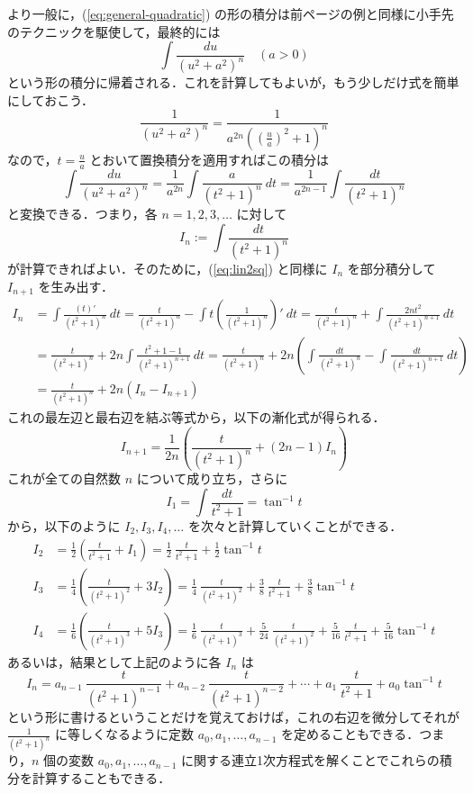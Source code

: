 \documentclass[10pt, uplatex, dvipdfmx]{jsarticle}
\theoremstyle{definition}
\numberwithin{equation}{section}
\newcommand{\ds}{\displaystyle}
\begin{document}
\newpage

より一般に，(\ref{eq:general-quadratic}) の形の積分は前ページの例と同様に小手先のテクニックを駆使して，最終的には
\[
  \int \frac{du}{(u^2+a^2)^n} \quad ( a>0 )
\]
という形の積分に帰着される．これを計算してもよいが，もう少しだけ式を簡単にしておこう．
\[
  \frac{1}{(u^2+a^2)^n} = \frac{1}{a^{2n}\left( \left(\frac{u}{a}\right)^2+1\right)^n}
\]
なので，$\ds t=\frac{u}{a}$ とおいて置換積分を適用すればこの積分は
\[
  \int \frac{du}{(u^2+a^2)^n} = \frac{1}{a^{2n}} \int \frac{a}{(t^2+1)^n} \ dt = \frac{1}{a^{2n-1}} \int \frac{dt}{(t^2+1)^n}
\]
と変換できる．つまり，各 $n=1,2,3, \ldots$ に対して
\[
  I_n := \int \frac{dt}{(t^2+1)^n} 
\]
が計算できればよい．そのために，(\ref{eq:lin2sq}) と同様に $I_{n}$ を部分積分して $I_{n+1}$ を生み出す．
\[
  \begin{aligned}
    I_{n}
    & = \int \frac{(t)'}{(t^2+1)^n} \ dt = \frac{t}{(t^2+1)^n} - \int t\left( \frac{1}{\left(t^2+1\right)^n}\right)' \ dt
      = \frac{t}{(t^2+1)^n} + \int \frac{2nt^2}{(t^2+1)^{n+1}} \ dt\\[2ex]
    & = \frac{t}{(t^2+1)^n} + 2n \int \frac{t^2+1 - 1}{(t^2+1)^{n+1}} \ dt
      =\frac{t}{(t^2+1)^n} + 2n \left( \int \frac{dt}{(t^2+1)^n} - \int \frac{dt}{(t^2+1)^{n+1}} \ dt\right)\\[2ex]
    &= \frac{t}{(t^2+1)^n} + 2n\left( I_n -  I_{n+1}\right)
  \end{aligned}
\]
これの最左辺と最右辺を結ぶ等式から，以下の漸化式が得られる．
\[
  I_{n+1} = \frac{1}{2n}\left( \frac{t}{(t^2+1)^n} + (2n-1)I_n\right)
\]
これが全ての自然数 $n$ について成り立ち，さらに
\[
  I_1 = \int \frac{dt}{t^2+1} = \tan^{-1}t
\]
から，以下のように $I_2, I_3, I_4, \ldots$ を次々と計算していくことができる．
\[
  \begin{aligned}
    I_2 &= \frac{1}{2}\left(\frac{t}{t^2+1} + I_1 \right) = \frac{1}{2}~ \frac{t}{t^2+1} + \frac{1}{2}\tan^{-1}t \\[1ex]
    I_3 &= \frac{1}{4}\left(\frac{t}{(t^2+1)^2} + 3 I_2\right)=\frac{1}{4}~\frac{t}{(t^2+1)^2}
          + \frac{3}{8}~\frac{t}{t^2+1} + \frac{3}{8} \tan^{-1} t \\[1ex]
    I_4 &= \frac{1}{6} \left( \frac{t}{(t^2+1)^3} + 5 I_3\right) = \frac{1}{6}~\frac{t}{(t^2+1)^3}
          + \frac{5}{24}~\frac{t}{(t^2+1)^2} + \frac{5}{16}~\frac{t}{t^2+1} + \frac{5}{16}\tan^{-1}t 
  \end{aligned}
\]
あるいは，結果として上記のように各 $I_n$ は
\[
  I_n = a_{n-1} ~\frac{t}{(t^2+1)^{n-1}} + a_{n-2} ~\frac{t}{(t^2+1)^{n-2}} + \cdots + a_1~ \frac{t}{t^2+1} + a_0 \tan^{-1}t
\]
という形に書けるということだけを覚えておけば，これの右辺を微分してそれが $\ds
\frac{1}{(t^2+1)^n}$ に等しくなるように定数 $a_0, a_1, \ldots,
a_{n-1}$ を定めることもできる．つまり，$n$ 個の変数 $a_0, a_1, \ldots,
a_{n-1}$ に関する連立1次方程式を解くことでこれらの積分を計算することもできる．
\end{document}
